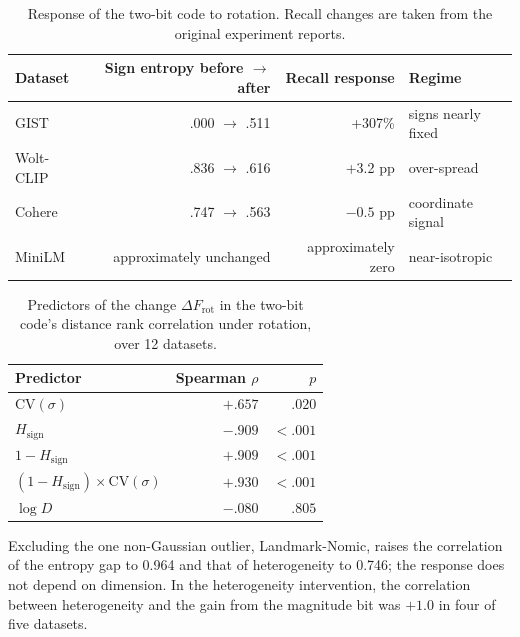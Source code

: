 \begin{table}[tbp]
\centering


\small
\begin{tabular}{lrrl}
\toprule
Dataset & Sign entropy before $\to$ after & Recall response & Regime \\
\midrule
GIST & .000 $\to$ .511 & +307\% & signs nearly fixed \\
Wolt-CLIP & .836 $\to$ .616 & +3.2 pp & over-spread \\
Cohere & .747 $\to$ .563 & $-0.5$ pp & coordinate signal \\
MiniLM & approximately unchanged & approximately zero & near-isotropic \\
\bottomrule
\end{tabular}

\small
\caption{Response of the two-bit code to rotation. Recall changes are taken from the original experiment reports.}
\label{tab:app-rotation}
\end{table}

\begin{table}[tbp]
\centering


\small
\begin{tabular}{lrr}
\toprule
Predictor & Spearman $\rho$ & $p$ \\
\midrule
$\mathrm{CV}(\sigma)$ & $+.657$ & $.020$ \\
$H_{\mathrm{sign}}$ & $-.909$ & $<.001$ \\
$1-H_{\mathrm{sign}}$ & $+.909$ & $<.001$ \\
$(1-H_{\mathrm{sign}})\times\mathrm{CV}(\sigma)$ & $\mathbf{+.930}$ & $<.001$ \\
$\log D$ & $-.080$ & $.805$ \\
\bottomrule
\end{tabular}

\small
\caption{Predictors of the change $\Delta F_{\mathrm{rot}}$ in the two-bit code's distance rank correlation under rotation, over 12 datasets.}
\label{tab:app-rotation-drivers}
\end{table}

Excluding the one non-Gaussian outlier, Landmark-Nomic, raises the correlation of the entropy gap to 0.964 and that of heterogeneity to 0.746; the response does not depend on dimension. In the heterogeneity intervention, the correlation between heterogeneity and the gain from the magnitude bit was $+1.0$ in four of five datasets.

